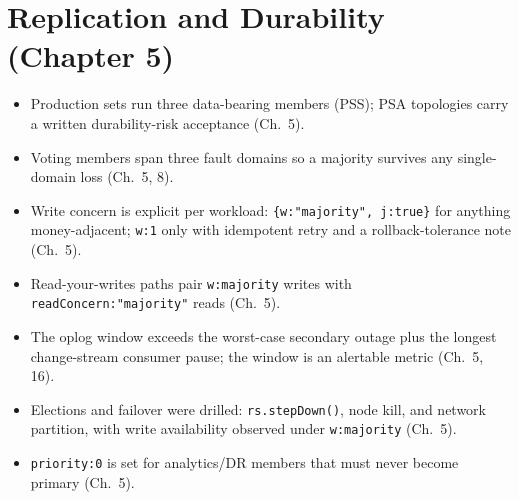 \section{Replication and Durability (Chapter 5)}
%
\begin{itemize}
    \item[$\square$] Production sets run three data-bearing members (PSS); PSA topologies carry a written durability-risk acceptance (Ch.~5).
    \item[$\square$] Voting members span three fault domains so a majority survives any single-domain loss (Ch.~5, 8).
    \item[$\square$] Write concern is explicit per workload: \texttt{\{w:"majority", j:true\}} for anything money-adjacent; \texttt{w:1} only with idempotent retry and a rollback-tolerance note (Ch.~5).
    \item[$\square$] Read-your-writes paths pair \texttt{w:majority} writes with \texttt{readConcern:"majority"} reads (Ch.~5).
    \item[$\square$] The oplog window exceeds the worst-case secondary outage plus the longest change-stream consumer pause; the window is an alertable metric (Ch.~5, 16).
    \item[$\square$] Elections and failover were drilled: \texttt{rs.stepDown()}, node kill, and network partition, with write availability observed under \texttt{w:majority} (Ch.~5).
    \item[$\square$] \texttt{priority:0} is set for analytics/DR members that must never become primary (Ch.~5).
\end{itemize}

